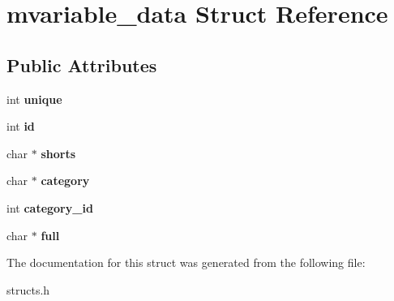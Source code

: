 \hypertarget{structmvariable__data}{\section{mvariable\-\_\-data Struct Reference}
\label{structmvariable__data}
}
\subsection*{Public Attributes}
\begin{DoxyCompactItemize}
\item 
\hypertarget{structmvariable__data_a1cd531a14e5edfc9c8e774e2b5029c0f}{int {\bfseries unique}}\label{structmvariable__data_a1cd531a14e5edfc9c8e774e2b5029c0f}

\item 
\hypertarget{structmvariable__data_ae547d95e0661c808ce69879439316889}{int {\bfseries id}}\label{structmvariable__data_ae547d95e0661c808ce69879439316889}

\item 
\hypertarget{structmvariable__data_a3bc64a49fa59032dd40216c8ece63c12}{char $\ast$ {\bfseries shorts}}\label{structmvariable__data_a3bc64a49fa59032dd40216c8ece63c12}

\item 
\hypertarget{structmvariable__data_a005d2774ed9a33d1f2be5b628a0a612c}{char $\ast$ {\bfseries category}}\label{structmvariable__data_a005d2774ed9a33d1f2be5b628a0a612c}

\item 
\hypertarget{structmvariable__data_ab447ff2cc2c667f5c406ac4b2404986c}{int {\bfseries category\-\_\-id}}\label{structmvariable__data_ab447ff2cc2c667f5c406ac4b2404986c}

\item 
\hypertarget{structmvariable__data_ae4dd988bed14131ebe7e5b3724e0a535}{char $\ast$ {\bfseries full}}\label{structmvariable__data_ae4dd988bed14131ebe7e5b3724e0a535}

\end{DoxyCompactItemize}


The documentation for this struct was generated from the following file\-:\begin{DoxyCompactItemize}
\item 
structs.\-h\end{DoxyCompactItemize}
